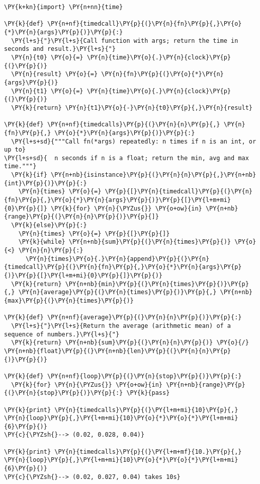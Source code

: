 \begin{Verbatim}[commandchars=\\\{\}]
\PY{k+kn}{import} \PY{n+nn}{time}

\PY{k}{def} \PY{n+nf}{timedcall}\PY{p}{(}\PY{n}{fn}\PY{p}{,}\PY{o}{*}\PY{n}{args}\PY{p}{)}\PY{p}{:}
  \PY{l+s}{"}\PY{l+s}{Call function with args; return the time in seconds and result.}\PY{l+s}{"}
  \PY{n}{t0} \PY{o}{=} \PY{n}{time}\PY{o}{.}\PY{n}{clock}\PY{p}{(}\PY{p}{)}
  \PY{n}{result} \PY{o}{=} \PY{n}{fn}\PY{p}{(}\PY{o}{*}\PY{n}{args}\PY{p}{)}
  \PY{n}{t1} \PY{o}{=} \PY{n}{time}\PY{o}{.}\PY{n}{clock}\PY{p}{(}\PY{p}{)}
  \PY{k}{return} \PY{n}{t1}\PY{o}{-}\PY{n}{t0}\PY{p}{,}\PY{n}{result}

\PY{k}{def} \PY{n+nf}{timedcalls}\PY{p}{(}\PY{n}{n}\PY{p}{,} \PY{n}{fn}\PY{p}{,} \PY{o}{*}\PY{n}{args}\PY{p}{)}\PY{p}{:}
  \PY{l+s+sd}{"""Call fn(*args) repeatedly: n times if n is an int, or up to}
\PY{l+s+sd}{  n seconds if n is a float; return the min, avg and max time."""}
  \PY{k}{if} \PY{n+nb}{isinstance}\PY{p}{(}\PY{n}{n}\PY{p}{,}\PY{n+nb}{int}\PY{p}{)}\PY{p}{:}
    \PY{n}{times} \PY{o}{=} \PY{p}{[}\PY{n}{timedcall}\PY{p}{(}\PY{n}{fn}\PY{p}{,}\PY{o}{*}\PY{n}{args}\PY{p}{)}\PY{p}{[}\PY{l+m+mi}{0}\PY{p}{]} \PY{k}{for} \PY{n}{\PYZus{}} \PY{o+ow}{in} \PY{n+nb}{range}\PY{p}{(}\PY{n}{n}\PY{p}{)}\PY{p}{]}
  \PY{k}{else}\PY{p}{:}
    \PY{n}{times} \PY{o}{=} \PY{p}{[}\PY{p}{]}
    \PY{k}{while} \PY{n+nb}{sum}\PY{p}{(}\PY{n}{times}\PY{p}{)} \PY{o}{<} \PY{n}{n}\PY{p}{:}
      \PY{n}{times}\PY{o}{.}\PY{n}{append}\PY{p}{(}\PY{n}{timedcall}\PY{p}{(}\PY{n}{fn}\PY{p}{,}\PY{o}{*}\PY{n}{args}\PY{p}{)}\PY{p}{[}\PY{l+m+mi}{0}\PY{p}{]}\PY{p}{)}
  \PY{k}{return} \PY{n+nb}{min}\PY{p}{(}\PY{n}{times}\PY{p}{)}\PY{p}{,} \PY{n}{average}\PY{p}{(}\PY{n}{times}\PY{p}{)}\PY{p}{,} \PY{n+nb}{max}\PY{p}{(}\PY{n}{times}\PY{p}{)}

\PY{k}{def} \PY{n+nf}{average}\PY{p}{(}\PY{n}{n}\PY{p}{)}\PY{p}{:}
  \PY{l+s}{"}\PY{l+s}{Return the average (arithmetic mean) of a sequence of numbers.}\PY{l+s}{"}
  \PY{k}{return} \PY{n+nb}{sum}\PY{p}{(}\PY{n}{n}\PY{p}{)} \PY{o}{/} \PY{n+nb}{float}\PY{p}{(}\PY{n+nb}{len}\PY{p}{(}\PY{n}{n}\PY{p}{)}\PY{p}{)}

\PY{k}{def} \PY{n+nf}{loop}\PY{p}{(}\PY{n}{stop}\PY{p}{)}\PY{p}{:} 
  \PY{k}{for} \PY{n}{\PYZus{}} \PY{o+ow}{in} \PY{n+nb}{range}\PY{p}{(}\PY{n}{stop}\PY{p}{)}\PY{p}{:} \PY{k}{pass}

\PY{k}{print} \PY{n}{timedcalls}\PY{p}{(}\PY{l+m+mi}{10}\PY{p}{,} \PY{n}{loop}\PY{p}{,}\PY{l+m+mi}{10}\PY{o}{*}\PY{o}{*}\PY{l+m+mi}{6}\PY{p}{)}
\PY{c}{\PYZsh{}--> (0.02, 0.028, 0.04)}

\PY{k}{print} \PY{n}{timedcalls}\PY{p}{(}\PY{l+m+mf}{10.}\PY{p}{,} \PY{n}{loop}\PY{p}{,}\PY{l+m+mi}{10}\PY{o}{*}\PY{o}{*}\PY{l+m+mi}{6}\PY{p}{)}
\PY{c}{\PYZsh{}--> (0.02, 0.027, 0.04) takes 10s}
\end{Verbatim}
